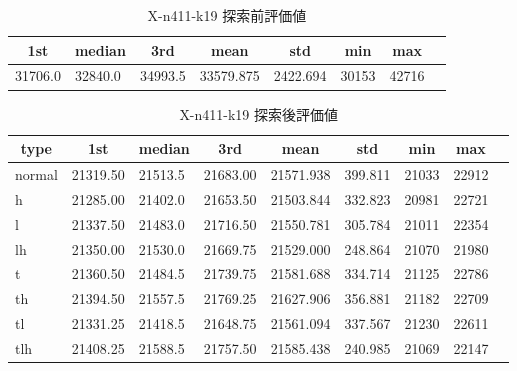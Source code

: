 \begin{table}[htbp]
    \caption{X-n411-k19 探索前評価値}
    \begin{tabular}{|l|l|l|l|l|l|l|l|}\hline
    \multicolumn{1}{|c|}{\textbf{1st}}
    &\multicolumn{1}{c|}{\textbf{median}}
    &\multicolumn{1}{c|}{\textbf{3rd}}
    &\multicolumn{1}{c|}{\textbf{mean}}
    &\multicolumn{1}{c|}{\textbf{std}}
    &\multicolumn{1}{c|}{\textbf{min}}
    &\multicolumn{1}{c|}{\textbf{max}}\\\hline
	31706.0 & 32840.0 & 34993.5 & 33579.875 & 2422.694 & 30153 & 42716\\\hline
	\end{tabular}
\end{table}
\begin{table}[htbp]
    \caption{X-n411-k19 探索後評価値}
    \begin{tabular}{|l|l|l|l|l|l|l|l|l|}\hline
    \multicolumn{1}{|c|}{\textbf{type}}
    &\multicolumn{1}{|c|}{\textbf{1st}}
    &\multicolumn{1}{c|}{\textbf{median}}
    &\multicolumn{1}{c|}{\textbf{3rd}}
    &\multicolumn{1}{c|}{\textbf{mean}}
    &\multicolumn{1}{c|}{\textbf{std}}
    &\multicolumn{1}{c|}{\textbf{min}}
    &\multicolumn{1}{c|}{\textbf{max}}\\\hline
	normal & 21319.50 & 21513.5 & 21683.00 & 21571.938 & 399.811 & 21033 & 22912\\\hline
	h & 21285.00 & 21402.0 & 21653.50 & 21503.844 & 332.823 & 20981 & 22721\\\hline
	l & 21337.50 & 21483.0 & 21716.50 & 21550.781 & 305.784 & 21011 & 22354\\\hline
	lh & 21350.00 & 21530.0 & 21669.75 & 21529.000 & 248.864 & 21070 & 21980\\\hline
	t & 21360.50 & 21484.5 & 21739.75 & 21581.688 & 334.714 & 21125 & 22786\\\hline
	th & 21394.50 & 21557.5 & 21769.25 & 21627.906 & 356.881 & 21182 & 22709\\\hline
	tl & 21331.25 & 21418.5 & 21648.75 & 21561.094 & 337.567 & 21230 & 22611\\\hline
	tlh & 21408.25 & 21588.5 & 21757.50 & 21585.438 & 240.985 & 21069 & 22147\\\hline
	\end{tabular}
\end{table}
